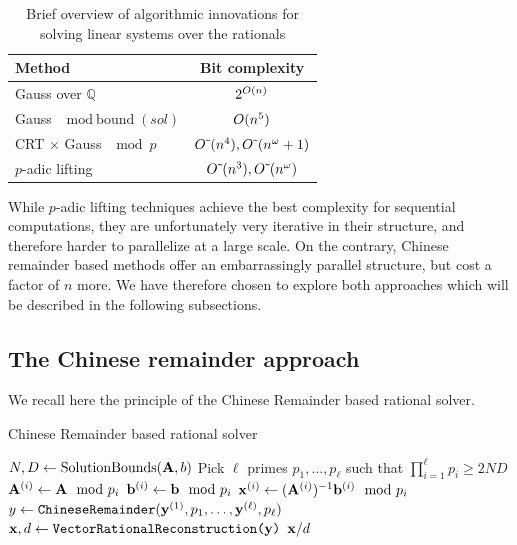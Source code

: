 \begin{table}[htb]
\begin{tabular}{lc}
  \toprule
  Method  & Bit complexity \\
  \midrule
  Gauss over $\mathbb{Q}$ & $2^{O(n)}$ \\
  Gauss $\mod \text{bound}(sol)$ & $O(n^5)$\\
  CRT $\times$ Gauss $\mod p$ & $O\tilde\ (n^4), O\tilde\ (n^\omega+1)$\\
  $p$-adic lifting & $O\tilde\ (n^3), O\tilde\ (n^\omega)$\\
  \bottomrule
\end{tabular}
\caption{Brief overview of algorithmic innovations for solving linear systems over the rationals}\label{tab:complexities}
\end{table}

While $p$-adic lifting techniques achieve the best complexity for sequential computations, they are unfortunately very
iterative in their structure, and therefore harder to parallelize at a large scale. On the contrary, Chinese remainder
based methods offer an embarrassingly parallel structure, but cost a factor of $n$ more. We have therefore chosen to
explore both approaches which will be described in the following subsections.
\subsection{The Chinese remainder approach}

We recall here the principle of the Chinese Remainder based rational solver.
\begin{algorithm}
  \caption{Chinese Remainder based rational solver}
  \begin{algorithmic}[1]
    \State $N,D \leftarrow \text{SolutionBounds}(\mathbf{A},b)$
    \State Pick $\ell$ primes $p_1,\dots, p_\ell$ such that $\prod_{i=1}^\ell p_i \geq 2ND$
    \State $\mathbf{A}^{(i)} \leftarrow \mathbf{A}\mod p_i$
    \State $\mathbf{b}^{(i)} \leftarrow \mathbf{b}\mod p_i$
    \State $\mathbf{x}^{(i)} \leftarrow (\mathbf{A}^{(i)})^{-1} \mathbf{b}^{(i)} \mod p_i$
    \EndFor
  \State $y \leftarrow \texttt{ChineseRemainder}(\mathbf{y}^{(1)},p_1,\dots, \mathbf{y}^{(\ell)},p_\ell)$
  \State $\mathbf{x},d\leftarrow \texttt{VectorRationalReconstruction(\ensuremath{\mathbf{y}})}$
  \State \Return $\mathbf{x}/d$
\end{algorithmic}
\end{algorithm}


